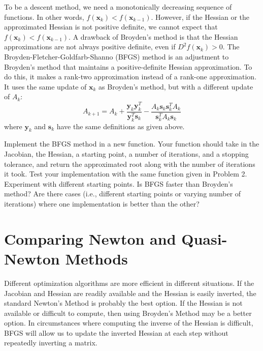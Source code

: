To be a descent method, we need a monotonically decreasing sequence of functions. In other words, $f(\mathbf{x}_{k})<f(\mathbf{x}_{k-1})$. However, if the Hessian or the approximated Hessian is not positive definite, we cannot expect that $f(\mathbf{x}_{k})<f(\mathbf{x}_{k-1})$. A drawback of Broyden's method is that the Hessian approximations are not always positive definite, even if $D^2f(\mathbf{x}_k)>0$. The Broyden-Fletcher-Goldfarb-Shanno (BFGS) method is an adjustment to Broyden's method that maintains a positive-definite Hessian approximation. To do this, it makes a rank-two approximation instead of a rank-one approximation. It uses the same update of $\mathbf{x}_k$ as Broyden's method, but with a different update of $A_k$:
\begin{equation} \label{Eq:BFGSHessian}
A_{k+1} = A_k + \frac{\mathbf{y}_k\mathbf{y}_k^T}{\mathbf{y}_k^T\mathbf{s}_k}-\frac{A_k\mathbf{s}_k\mathbf{s}_k^TA_k}{\mathbf{s}_k^TA_k\mathbf{s}_k}
\end{equation}
where $\mathbf{y}_k$ and $\mathbf{s}_k$ have the same definitions as given above.

\begin{problem}
Implement the BFGS method in a new function. Your function should take in the Jacobian, the Hessian, a starting point, a number of iterations, and a stopping tolerance, and return the approximated root along with the number of iterations it took. Test your implementation with the same function given in Problem 2. Experiment with different starting points. Is BFGS faster than Broyden's method? Are there cases (i.e., different starting points or varying number of iterations) where one implementation is better than the other?
\end{problem}

\section*{Comparing Newton and Quasi-Newton Methods}

Different optimization algorithms are more efficient in different situations. If the
Jacobian and Hessian are readily available and the Hessian is easily inverted, the standard
Newton's Method is probably the best option. If the Hessian is not available or difficult to
compute, then using Broyden's Method may be a better option. In circumstances where computing
the inverse of the Hessian is difficult, BFGS will allow us to update the inverted Hessian
at each step without repeatedly inverting a matrix.

